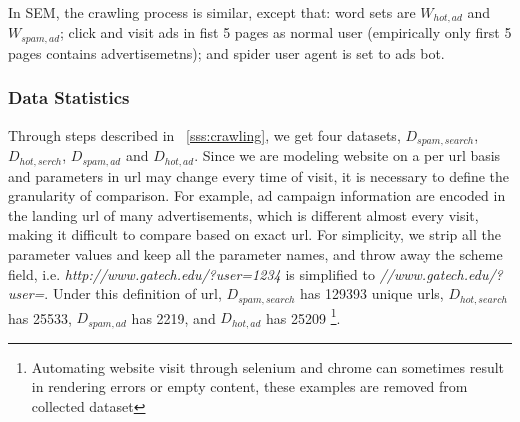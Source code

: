 In SEM, the crawling process is similar, except that: word sets are
$W_{hot, ad}$ and $W_{spam, ad}$; click and visit ads in fist 5 pages as normal
user (empirically only first 5 pages contains advertisemetns); 
and spider user agent is set to ads bot.

\subsubsection{Data Statistics}
Through steps described in ~\autoref{sss:crawling}, we get four datasets,
$D_{spam, search}$, $D_{hot, serch}$, $D_{spam, ad}$ and $D_{hot, ad}$.
Since we are modeling website on a per url basis and parameters in url may
change every time of visit, it is necessary to define the granularity of
comparison. For example, ad campaign information are encoded in the landing url of many 
advertisements, which is different almost every visit, making it difficult to
compare based on exact url.
For simplicity, we strip all the parameter
values and keep all the parameter names, and throw away the scheme field, i.e.
{\it http://www.gatech.edu/?user=1234} is simplified to
{\it //www.gatech.edu/?user=}. Under this definition of url, $D_{spam, search}$
has 129393 unique urls, $D_{hot, search}$ has 25533, $D_{spam, ad}$ has 2219,
and $D_{hot, ad}$ has 25209
\footnote{Automating website visit through selenium
  and chrome can sometimes result in rendering errors or empty content, these
examples are removed from collected dataset}.


%

